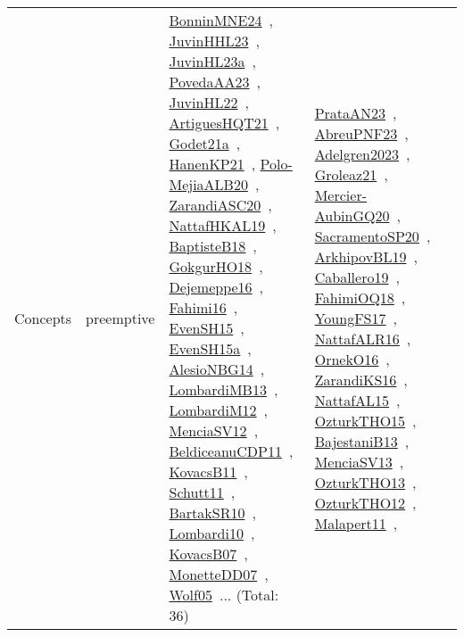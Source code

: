 {\begin{longtable}{lp{3cm}>{\raggedright\arraybackslash}p{6cm}>{\raggedright\arraybackslash}p{6cm}>{\raggedright\arraybackslash}p{8cm}}
Concepts & preemptive & \href{../works/BonninMNE24.pdf}{BonninMNE24}~\cite{BonninMNE24}, \href{../works/JuvinHHL23.pdf}{JuvinHHL23}~\cite{JuvinHHL23}, \href{../works/JuvinHL23a.pdf}{JuvinHL23a}~\cite{JuvinHL23a}, \href{../works/PovedaAA23.pdf}{PovedaAA23}~\cite{PovedaAA23}, \href{../works/JuvinHL22.pdf}{JuvinHL22}~\cite{JuvinHL22}, \href{../works/ArtiguesHQT21.pdf}{ArtiguesHQT21}~\cite{ArtiguesHQT21}, \href{../works/Godet21a.pdf}{Godet21a}~\cite{Godet21a}, \href{../works/HanenKP21.pdf}{HanenKP21}~\cite{HanenKP21}, \href{../works/Polo-MejiaALB20.pdf}{Polo-MejiaALB20}~\cite{Polo-MejiaALB20}, \href{../works/ZarandiASC20.pdf}{ZarandiASC20}~\cite{ZarandiASC20}, \href{../works/NattafHKAL19.pdf}{NattafHKAL19}~\cite{NattafHKAL19}, \href{../works/BaptisteB18.pdf}{BaptisteB18}~\cite{BaptisteB18}, \href{../works/GokgurHO18.pdf}{GokgurHO18}~\cite{GokgurHO18}, \href{../works/Dejemeppe16.pdf}{Dejemeppe16}~\cite{Dejemeppe16}, \href{../works/Fahimi16.pdf}{Fahimi16}~\cite{Fahimi16}, \href{../works/EvenSH15.pdf}{EvenSH15}~\cite{EvenSH15}, \href{../works/EvenSH15a.pdf}{EvenSH15a}~\cite{EvenSH15a}, \href{../works/AlesioNBG14.pdf}{AlesioNBG14}~\cite{AlesioNBG14}, \href{../works/LombardiMB13.pdf}{LombardiMB13}~\cite{LombardiMB13}, \href{../works/LombardiM12.pdf}{LombardiM12}~\cite{LombardiM12}, \href{../works/MenciaSV12.pdf}{MenciaSV12}~\cite{MenciaSV12}, \href{../works/BeldiceanuCDP11.pdf}{BeldiceanuCDP11}~\cite{BeldiceanuCDP11}, \href{../works/KovacsB11.pdf}{KovacsB11}~\cite{KovacsB11}, \href{../works/Schutt11.pdf}{Schutt11}~\cite{Schutt11}, \href{../works/BartakSR10.pdf}{BartakSR10}~\cite{BartakSR10}, \href{../works/Lombardi10.pdf}{Lombardi10}~\cite{Lombardi10}, \href{../works/KovacsB07.pdf}{KovacsB07}~\cite{KovacsB07}, \href{../works/MonetteDD07.pdf}{MonetteDD07}~\cite{MonetteDD07}, \href{../works/Wolf05.pdf}{Wolf05}~\cite{Wolf05}... (Total: 36) & \href{../works/PrataAN23.pdf}{PrataAN23}~\cite{PrataAN23}, \href{../works/AbreuPNF23.pdf}{AbreuPNF23}~\cite{AbreuPNF23}, \href{../works/Adelgren2023.pdf}{Adelgren2023}~\cite{Adelgren2023}, \href{../works/Groleaz21.pdf}{Groleaz21}~\cite{Groleaz21}, \href{../works/Mercier-AubinGQ20.pdf}{Mercier-AubinGQ20}~\cite{Mercier-AubinGQ20}, \href{../works/SacramentoSP20.pdf}{SacramentoSP20}~\cite{SacramentoSP20}, \href{../works/ArkhipovBL19.pdf}{ArkhipovBL19}~\cite{ArkhipovBL19}, \href{../works/Caballero19.pdf}{Caballero19}~\cite{Caballero19}, \href{../works/FahimiOQ18.pdf}{FahimiOQ18}~\cite{FahimiOQ18}, \href{../works/YoungFS17.pdf}{YoungFS17}~\cite{YoungFS17}, \href{../works/NattafALR16.pdf}{NattafALR16}~\cite{NattafALR16}, \href{../works/OrnekO16.pdf}{OrnekO16}~\cite{OrnekO16}, \href{../works/ZarandiKS16.pdf}{ZarandiKS16}~\cite{ZarandiKS16}, \href{../works/NattafAL15.pdf}{NattafAL15}~\cite{NattafAL15}, \href{../works/OzturkTHO15.pdf}{OzturkTHO15}~\cite{OzturkTHO15}, \href{../works/BajestaniB13.pdf}{BajestaniB13}~\cite{BajestaniB13}, \href{../works/MenciaSV13.pdf}{MenciaSV13}~\cite{MenciaSV13}, \href{../works/OzturkTHO13.pdf}{OzturkTHO13}~\cite{OzturkTHO13}, \href{../works/OzturkTHO12.pdf}{OzturkTHO12}~\cite{OzturkTHO12}, \href{../works/Malapert11.pdf}{Malapert11}~\cite{Malapert11}, 
\end{longtable}}
